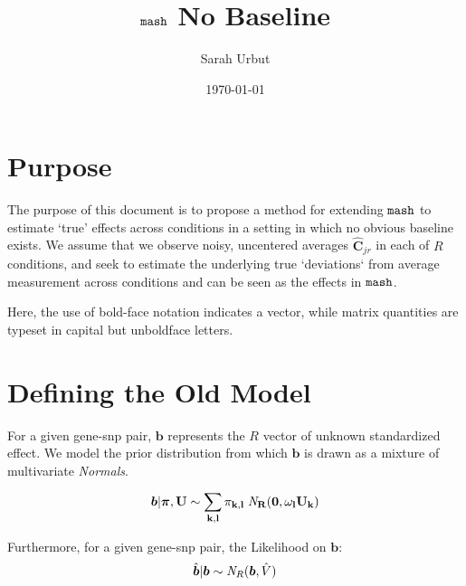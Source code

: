 \documentclass[11pt, oneside]{article}   	%
\title{ $\mash$ No Baseline}
\author{Sarah Urbut}
\date{\today}
\newcommand{\chat}{\bm{\hat{C}}}
\def\mash{{\tt mash}}
\begin{document}
\maketitle

\tableofcontents
\newpage

\section{Purpose}

The purpose of this document is to propose a method for extending $\mash$ to estimate `true' effects across conditions in a setting in which no obvious baseline exists. We assume that we observe noisy, uncentered averages $\chat_{jr}$ in each of $R$ conditions, and seek to estimate the underlying true `deviations` from average measurement across conditions and can be seen as the effects in $\mash$.

Here, the use of bold-face notation indicates a vector, while matrix quantities are typeset in capital but unboldface letters.



\section{Defining the Old Model}

For a given gene-snp pair, $\bm{b}$ represents the $R$ vector of unknown standardized effect. We model the prior distribution from which $\bm{b}$ is drawn as a mixture of multivariate {\it Normals}.
 
 \begin{equation}
  \label{prior_b_mixt_grid}
  \bm{b} | \bm{\pi},\bf{U} \sim \sum_{k,l} \pi_{k,l} \;{\it N}_R(\bm{0}, \omega_l U_{k})
\end{equation}

Furthermore, for a given gene-snp pair, the Likelihood on $\bm{b}$: 
\begin{equation}
  \label{new_lik}
  \hat{\bm{b}} | \bm{b} \sim {\it N}_R(\bm{b}, \hat{V})
\end{equation}
\end{document}
